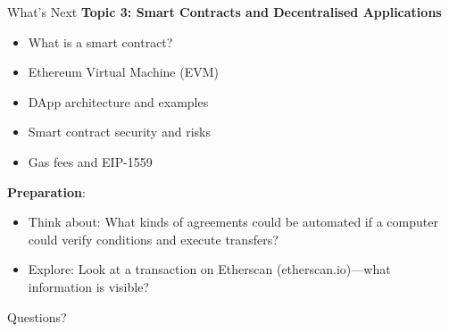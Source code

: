 \documentclass[10pt]{beamer}
\begin{document}
\begin{frame}{What's Next}
  \textbf{Topic 3: Smart Contracts and Decentralised Applications}
  \begin{itemize}
    \item What is a smart contract?
    \item Ethereum Virtual Machine (EVM)
    \item DApp architecture and examples
    \item Smart contract security and risks
    \item Gas fees and EIP-1559
  \end{itemize}
  
  \vspace{1em}
  \textbf{Preparation}:
  \begin{itemize}
    \item Think about: What kinds of agreements could be automated if a computer could verify conditions and execute transfers?
    \item Explore: Look at a transaction on Etherscan (etherscan.io)---what information is visible?
  \end{itemize}
\end{frame}

\begin{frame}[plain]
  \vfill
  \begin{center}
    {\Large Questions?}
  \end{center}
  \vfill
\end{frame}
\end{document}
